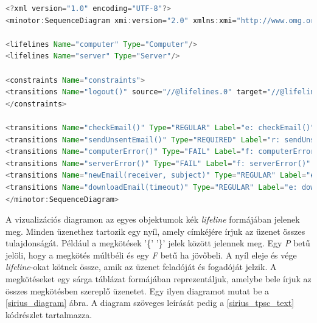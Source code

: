 \begin{lstlisting}[language=java, frame=single, float=ht!, caption={Szenárió diagram xml leírása.},captionpos=b, label=sirius_xml]
<?xml version="1.0" encoding="UTF-8"?>
<minotor:SequenceDiagram xmi:version="2.0" xmlns:xmi="http://www.omg.org/XMI" xmlns:minotor="hu.bme.mit.mdsd.xboyz.erdiagram" Name="Email">

<lifelines Name="computer" Type="Computer"/>
<lifelines Name="server" Type="Server"/>

<constraints Name="constraints">
<transitions Name="logout()" source="//@lifelines.0" target="//@lifelines.1"/>
</constraints>

<transitions Name="checkEmail()" Type="REGULAR" Label="e: checkEmail()" source="//@lifelines.0" target="//@lifelines.0"  after="//@transitions.1" reset="x"/>
<transitions Name="sendUnsentEmail()" Type="REQUIRED" Label="r: sendUnsentEmail()" source="//@lifelines.0" target="//@lifelines.1" before="//@transitions.0" after="//@transitions.2"/>
<transitions Name="computerError()" Type="FAIL" Label="f: computerError()" source="//@lifelines.1" target="//@lifelines.0" before="//@transitions.1" after="//@transitions.3"/>
<transitions Name="serverError()" Type="FAIL" Label="f: serverError()" source="//@lifelines.0" target="//@lifelines.1" before="//@transitions.2" after="//@transitions.4"/>
<transitions Name="newEmail(receiver, subject)" Type="REGULAR" Label="e: newEmail(receiver, subject)" source="//@lifelines.0" target="//@lifelines.1" before="//@transitions.3" after="//@transitions.5" constraint="//@constraints.0" constraintType="PAST"/>
<transitions Name="downloadEmail(timeout)" Type="REGULAR" Label="e: downloadEmail(timeout)" source="//@lifelines.0" target="//@lifelines.1" before="//@transitions.4"   clockConstraint="x &gt; 10"/>
</minotor:SequenceDiagram>
\end{lstlisting}

A vizualizációs diagramon az egyes objektumok kék \textit{lifeline} formájában jelenek meg.
Minden üzenethez tartozik egy nyíl, amely címkéjére írjuk az üzenet összes tulajdonságát.
Például a megkötések '\{' '\}' jelek között jelennek meg.
Egy \textit{P} betű jelöli, hogy a megkötés múltbéli és egy \textit{F} betű ha jövőbeli.
A nyíl eleje és vége \textit{lifeline}-okat kötnek össze, amik az üzenet feladóját és fogadóját jelzik.
A megkötéseket egy sárga táblázat formájában reprezentáljuk, amelybe bele írjuk az összes megkötésben szereplő üzenetet.
Egy ilyen diagramot mutat be a \ref{sirius_diagram} ábra.
A diagram szöveges leírását pedig a \ref{sirius_tpsc_text} kódrészlet tartalmazza.

